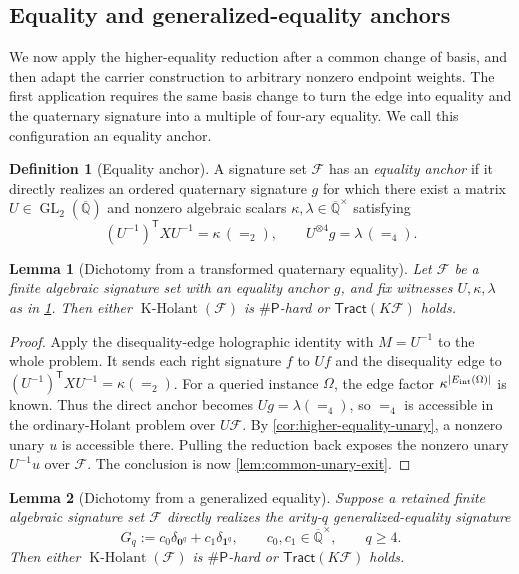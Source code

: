 \documentclass[11pt,letterpaper,onecolumn]{article}
\theoremstyle{plain}
\newtheorem{lemma}[lemma]{Lemma}
\theoremstyle{definition}
\newtheorem{definition}[definition]{Definition}
\theoremstyle{remark}
\newcommand{\AlgNums}{\overline{\mathbb Q}}
\newcommand{\cF}{\mathcal F}
\newcommand{\KHolant}{\operatorname{K\text{-}Holant}}
\newcommand{\Tract}{\mathsf{Tract}}
\newcommand{\SharpP}{\#\mathsf P}
\newcommand{\GL}{\operatorname{GL}}
\newcommand{\Eq}{=}
\newcommand{\one}{\mathbf 1}
\newcommand{\zero}{\mathbf 0}
\begin{document}
\subsection{Equality and generalized-equality anchors}
\label{proofsubsec:equality-anchor}

We now apply the higher-equality reduction after a common change of
basis, and then adapt the carrier construction to arbitrary nonzero
endpoint weights. The first application requires the same basis change to turn
the edge into equality and the quaternary signature into a multiple of
four-ary equality. We call this configuration an equality anchor.

\begin{definition}[Equality anchor]
\label{def:equality-anchor}
A signature set \(\cF\) has an \emph{equality anchor} if it directly
realizes an ordered quaternary signature \(g\) for which there exist a matrix
\(U\in\GL_2(\AlgNums)\) and nonzero algebraic scalars
\(\kappa,\lambda\in\AlgNums^\times\) satisfying
\[
  (U^{-1})^{\mathsf T}XU^{-1}=\kappa\,(\Eq_2),
  \qquad
  U^{\otimes4}g=\lambda\,(\Eq_4).
\]
\end{definition}

\begin{lemma}[Dichotomy from a transformed quaternary equality]
\label{lem:equality-anchor}
Let \(\cF\) be a finite algebraic signature set with an equality anchor
\(g\), and fix witnesses \(U,\kappa,\lambda\) as in
\cref{def:equality-anchor}.  Then either \(\KHolant(\cF)\) is
\(\SharpP\)-hard or \(\Tract(K\cF)\) holds.
\end{lemma}

\begin{proof}
Apply the disequality-edge holographic identity with \(M=U^{-1}\) to the whole
problem.  It sends
each right signature \(f\) to \(Uf\) and the disequality edge to
\((U^{-1})^{\mathsf T}XU^{-1}=\kappa(\Eq_2)\). For a queried instance
\(\Omega\), the edge factor \(\kappa^{|E_{\rm int}(\Omega)|}\) is known.
Thus the direct anchor becomes
\(Ug=\lambda(\Eq_4)\), so \(\Eq_4\) is accessible in the ordinary-Holant
problem over \(U\cF\).  By
\cref{cor:higher-equality-unary}, a nonzero unary \(u\) is accessible there.
Pulling the reduction back exposes the nonzero unary \(U^{-1}u\) over
\(\cF\).  The conclusion is now \cref{lem:common-unary-exit}.
\end{proof}

\begin{lemma}[Dichotomy from a generalized equality]
\label{lem:pure-ge}
Suppose a retained finite algebraic signature set \(\cF\) directly realizes
the arity-\(q\) generalized-equality signature
\[
  G_q:=c_0\delta_{\zero^q}+c_1\delta_{\one^q},
  \qquad c_0,c_1\in\AlgNums^\times,\qquad q\ge4.
\]
Then either \(\KHolant(\cF)\) is \(\SharpP\)-hard or
\(\Tract(K\cF)\) holds.
\end{lemma}
\end{document}

